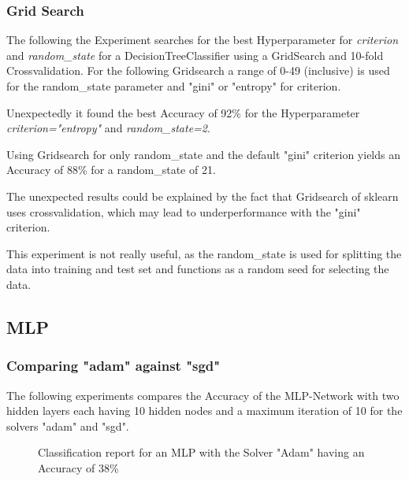 \documentclass[a4paper, 11pt]{article}
\begin{document}
\subsubsection{Grid Search}

The following the Experiment searches for the best Hyperparameter for \textit{criterion} and \textit{random\_state} for a DecisionTreeClassifier using a GridSearch and 10-fold Crossvalidation.
For the following Gridsearch a range of 0-49 (inclusive) is used for the random\_state parameter and "gini" or "entropy" for criterion.

Unexpectedly it found the best Accuracy of 92\% for the Hyperparameter \textit{criterion="entropy"} and \textit{random\_state=2}.

Using Gridsearch for only random\_state and the default "gini" criterion yields an Accuracy of 88\% for a random\_state of 21.

The unexpected results could be explained by the fact that Gridsearch of sklearn uses crossvalidation, which may lead to underperformance with the "gini" criterion.

This experiment is not really useful, as the random\_state is used for splitting the data into training and test set and functions as a random seed for selecting the data.

\subsection{MLP}
\subsubsection{Comparing "adam" against "sgd"}

The following experiments compares the Accuracy of the MLP-Network with two hidden layers each having 10 hidden nodes and a maximum iteration of 10 for the solvers "adam" and "sgd".

\begin{figure}[H]
\centering
{}
\caption{Classification report for an MLP with the Solver "Adam" having an Accuracy of 38\%}
\end{figure}
\end{document}
